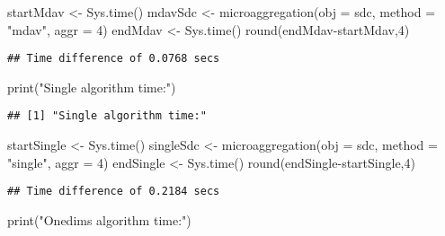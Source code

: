 \documentclass[
]{article}
\newenvironment{Shaded}{\begin{snugshade}}{\end{snugshade}}
\newcommand{\AttributeTok}[1]{\textcolor[rgb]{0.77,0.63,0.00}{#1}}
\newcommand{\DecValTok}[1]{\textcolor[rgb]{0.00,0.00,0.81}{#1}}
\newcommand{\FunctionTok}[1]{\textcolor[rgb]{0.00,0.00,0.00}{#1}}
\newcommand{\NormalTok}[1]{#1}
\newcommand{\OtherTok}[1]{\textcolor[rgb]{0.56,0.35,0.01}{#1}}
\newcommand{\SpecialCharTok}[1]{\textcolor[rgb]{0.00,0.00,0.00}{#1}}
\newcommand{\StringTok}[1]{\textcolor[rgb]{0.31,0.60,0.02}{#1}}
\begin{document}
\begin{Shaded}
\begin{Highlighting}[]
\NormalTok{startMdav }\OtherTok{\textless{}{-}} \FunctionTok{Sys.time}\NormalTok{()}
\NormalTok{mdavSdc }\OtherTok{\textless{}{-}} \FunctionTok{microaggregation}\NormalTok{(}\AttributeTok{obj =}\NormalTok{ sdc, }\AttributeTok{method =} \StringTok{"mdav"}\NormalTok{, }\AttributeTok{aggr  =} \DecValTok{4}\NormalTok{)}
\NormalTok{endMdav }\OtherTok{\textless{}{-}} \FunctionTok{Sys.time}\NormalTok{()}
\FunctionTok{round}\NormalTok{(endMdav}\SpecialCharTok{{-}}\NormalTok{startMdav,}\DecValTok{4}\NormalTok{)}
\end{Highlighting}
\end{Shaded}

\begin{verbatim}
## Time difference of 0.0768 secs
\end{verbatim}

\begin{Shaded}
\begin{Highlighting}[]
\FunctionTok{print}\NormalTok{(}\StringTok{"Single algorithm time:"}\NormalTok{)}
\end{Highlighting}
\end{Shaded}

\begin{verbatim}
## [1] "Single algorithm time:"
\end{verbatim}

\begin{Shaded}
\begin{Highlighting}[]
\NormalTok{startSingle }\OtherTok{\textless{}{-}} \FunctionTok{Sys.time}\NormalTok{()}
\NormalTok{singleSdc }\OtherTok{\textless{}{-}} \FunctionTok{microaggregation}\NormalTok{(}\AttributeTok{obj =}\NormalTok{ sdc, }\AttributeTok{method =} \StringTok{"single"}\NormalTok{, }\AttributeTok{aggr =} \DecValTok{4}\NormalTok{)}
\NormalTok{endSingle }\OtherTok{\textless{}{-}} \FunctionTok{Sys.time}\NormalTok{()}
\FunctionTok{round}\NormalTok{(endSingle}\SpecialCharTok{{-}}\NormalTok{startSingle,}\DecValTok{4}\NormalTok{)}
\end{Highlighting}
\end{Shaded}

\begin{verbatim}
## Time difference of 0.2184 secs
\end{verbatim}

\begin{Shaded}
\begin{Highlighting}[]
\FunctionTok{print}\NormalTok{(}\StringTok{"Onedims algorithm time:"}\NormalTok{)}
\end{Highlighting}
\end{Shaded}
\end{document}
